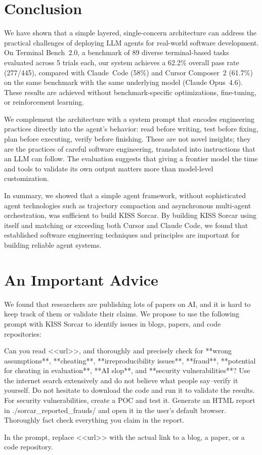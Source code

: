 \documentclass{article}
\begin{document}
\section{Conclusion}
\label{sec:conclusion}

We have shown that a simple layered, single-concern architecture can address the practical challenges of deploying LLM agents for real-world software development.  On Terminal Bench~2.0, a benchmark of 89 diverse terminal-based tasks evaluated across 5 trials each, our system achieves a 62.2\% overall pass rate (277/445), compared with Claude~Code (58\%) and Cursor Composer~2 (61.7\%) on the same benchmark with the same underlying model (Claude Opus~4.6).  These results are achieved without benchmark-specific optimizations, fine-tuning, or reinforcement learning.

We complement the architecture with a system prompt that encodes engineering practices directly into the agent's behavior: read before writing, test before fixing, plan before executing, verify before finishing.  These are not novel insights; they are the practices of careful software engineering, translated into instructions that an LLM can follow.  The evaluation suggests that giving a frontier model the time and tools to validate its own output matters more than model-level customization.

In summary, we showed that a simple agent framework, without sophisticated agent technologies such as trajectory compaction and asynchronous multi-agent orchestration, was sufficient to build KISS Sorcar.  By building KISS Sorcar using itself and matching or exceeding both Cursor and Claude Code, we found that established software engineering techniques and principles are important for building reliable agent systems.

\section*{An Important Advice} We found that researchers are publishing 
lots of papers on AI, and it is hard to keep track of them or validate their claims. We propose to use the following prompt with KISS Sorcar to identify issues in blogs, papers, and code repositories:

\begin{prompt}
Can you read <<url>>, and thoroughly and precisely check for **wrong assumptions**, **cheating**,
**irreproducibility issues**, **fraud**, **potential for cheating in evaluation**,
**AI slop**, and **security vulnerabilities**?  
Use the internet search extensively and do not believe what people say--verify it yourself.  
Do not hesitate to download the code and run it to validate the results.
For security vulnerabilities, create a POC and test it.  
Generate an HTML report in ./sorcar_reported_frauds/ and open it in the user's default browser.
Thoroughly fact check everything you claim in the report.
\end{prompt}
In the prompt, replace <<url>> with the actual link to a blog, a paper, or a code repository.
\end{document}
